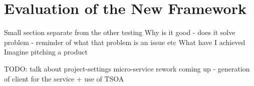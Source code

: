 \chapter{Evaluation of the New Framework}
Small section separate from the other testing
Why is it good
- does it solve problem - reminder of what that problem is an issue etc
What have I achieved
Imagine pitching a product

TODO: talk about project-settings micro-service rework coming up - generation of client for the service + use of TSOA
